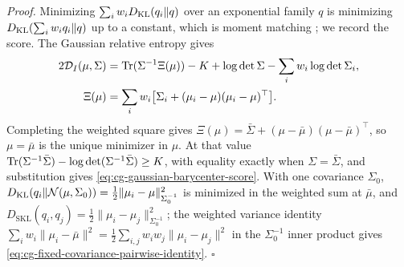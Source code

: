 \noindent\emph{Proof.}
Minimizing \(\sum_iw_iD_{\mathrm{KL}}(q_i\Vert q)\) over an exponential family \(q\) is
minimizing \(D_{\mathrm{KL}}(\sum_iw_iq_i\Vert q)\) up to a constant, which is moment
matching \citep[Sec.~10.7, Eqs.~(10.184)--(10.187)]{Bishop2006}; we record the
score. The Gaussian relative entropy gives
\begin{equation}
\begin{aligned}
2\mathcal D_I(\mu,\Sigma)
&=\operatorname{Tr}(\Sigma^{-1}\Xi(\mu))-K+\log\det\Sigma
-\sum_i w_i\log\det\Sigma_i,\\
\Xi(\mu)&=\sum_i w_i\bigl[\Sigma_i+(\mu_i-\mu)(\mu_i-\mu)^\top\bigr].
\end{aligned}
\label{eq:cg-gaussian-barycenter-expansion}
\end{equation}
Completing the weighted square gives
\(\Xi(\mu)=\bar\Sigma+(\mu-\bar\mu)(\mu-\bar\mu)^\top\), so \(\mu=\bar\mu\) is
the unique minimizer in \(\mu\). At that value
\(\operatorname{Tr}(\Sigma^{-1}\bar\Sigma)-\log\det(\Sigma^{-1}\bar\Sigma)\geq K\), with
equality exactly when \(\Sigma=\bar\Sigma\), and substitution gives
\eqref{eq:cg-gaussian-barycenter-score}. With one covariance \(\Sigma_0\),
\(D_{\mathrm{KL}}(q_i\Vert\mathcal N(\mu,\Sigma_0))=\frac12\|\mu_i-\mu\|^2_{\Sigma_0^{-1}}\)
is minimized in the weighted sum at \(\bar\mu\), and
\(D_{\mathrm{SKL}}(q_i,q_j)=\frac12\|\mu_i-\mu_j\|^2_{\Sigma_0^{-1}}\); the
weighted variance identity
\(\sum_iw_i\|\mu_i-\bar\mu\|^2=\frac12\sum_{i,j}w_iw_j\|\mu_i-\mu_j\|^2\) in the
\(\Sigma_0^{-1}\) inner product gives
\eqref{eq:cg-fixed-covariance-pairwise-identity}. \(\square\)

